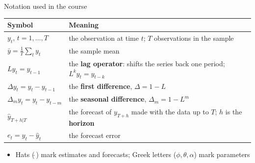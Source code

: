 \begin{frame}{Notation used in the course}
\itemsize{\footnotesize}
\begin{center}
\footnotesize
\begin{tabular}{>{\raggedright\arraybackslash}p{3.2cm}>{\raggedright\arraybackslash}p{8.8cm}}
\toprule
\textbf{Symbol} & \textbf{Meaning} \\
\midrule
$y_t$, $t = 1, \ldots, T$ & the observation at time $t$; $T$ observations in the sample \\
$\bar y = \frac1T \sum_t y_t$ & the sample mean \\
$L y_t = y_{t-1}$ & the \textbf{lag operator}: shifts the series back one period; $L^k y_t = y_{t-k}$ \\
$\Delta y_t = y_t - y_{t-1}$ & the \textbf{first difference}, $\Delta = 1 - L$ \\
$\Delta_m y_t = y_t - y_{t-m}$ & the \textbf{seasonal difference}, $\Delta_m = 1 - L^m$ \\
$\hat y_{T+h|T}$ & the forecast of $y_{T+h}$ made with the data up to $T$; $h$ is the \textbf{horizon} \\
$e_t = y_t - \hat y_t$ & the forecast error \\
\bottomrule
\end{tabular}
\end{center}
\begin{itemize}
    \item Hats ($\hat{\ }$) mark estimates and forecasts; Greek letters ($\phi, \theta, \alpha$) mark parameters
\end{itemize}
\end{frame}

